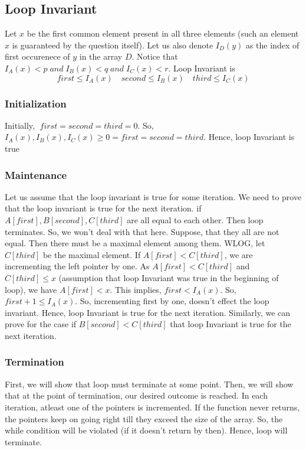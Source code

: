 \documentclass{article}
\begin{document}
\subsection*{Loop Invariant}
Let $x$ be the first common element present in all three elements (such an element $x$ is guaranteed by the question itself). Let us also denote $I_D(y)$ as the index of first occurenece of $y$ in the array $D$. Notice that $ I_A(x) < p \; and \; I_B(x) < q \; and \; I_C(x) < r$. Loop Invariant is $$first \leq I_A(x) \quad second \leq I_B(x) \quad third \leq I_C(x) $$ 

\subsubsection*{Initialization}
Initially, $ \; first = second = third = 0$. So, $I_A(x), I_B(x), I_C(x) \geq 0 = first = second = third$. Hence, loop Invariant is true

\subsubsection*{Maintenance}
Let us assume that the loop invariant is true for some iteration. We need to prove that the loop invariant is true for the next iteration. if $A[first], B[second], C[third]$ are all equal to each other. Then loop terminates. So, we won't deal with that here. Suppose, that they all are not equal. Then there must be a maximal element among them. WLOG, let $C[third]$ be the maximal element. If $A[first] < C[third]$, we are incrementing the left pointer by one. As $A[first] < C[third]$ and $C[third] \leq x$ (assumption that loop Invariant was true in the beginning of loop), we have $A[first] < x$. 
This implies, $first < I_A(x)$. So, $first + 1 \leq I_A(x)$. So, incrementing first by one, doesn't effect the loop invariant. Hence, loop Invariant is true for the next iteration. Similarly, we can prove for the case if $B[second] < C[third]$ that loop Invariant is true for the next iteration.

\subsubsection*{Termination}
First, we will show that loop must terminate at some point. Then, we will show that at the point of termination, our desired outcome is reached.
In each iteration, atleast one of the pointers is incremented. If the function never returns, the pointers keep on going right till they exceed the size of the array. So, the while condition will be violated (if it doesn't return by then). Hence, loop will terminate. 
\end{document}
